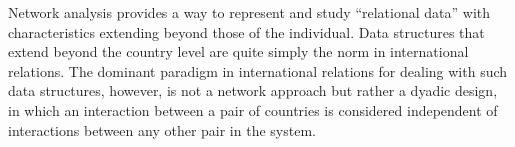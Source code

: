 \documentclass[12pt,pdflatex]{elsarticle}
\begin{document}
%
%
%
%
%
%

\newpage\setcounter{page}{1} 

Network analysis provides a way to represent and study ``relational data'' with characteristics extending beyond those of the individual.   Data structures that extend beyond the country level are quite simply the norm in international relations. The dominant paradigm in  international relations for dealing with such data structures, however, is not a network approach but rather a dyadic design, in which an interaction between a pair of countries is considered independent of interactions between any other pair in the system.%
\end{document}
